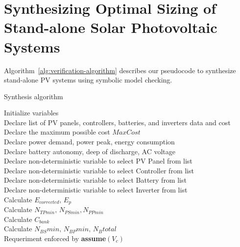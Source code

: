 \documentclass[10pt,conference]{IEEEtran}
\begin{document}
\section{Synthesizing Optimal Sizing of Stand-alone Solar Photovoltaic Systems}
Algorithm~\ref{alg:verification-algorithm} describes our pseudocode to synthesize stand-alone PV systems using symbolic model checking. 
%
 \begin{algorithm}
 \caption{Synthesis algorithm}
 \begin{algorithmic}[1]
 \begin{scriptsize}
 
 \renewcommand{\algorithmicrequire}{\textbf{Input:}}
 \renewcommand{\algorithmicensure}{\textbf{Output:}}
  \STATE Initialize variables \\
  \STATE Declare list of PV panels, controllers, batteries, and inverters data and cost \\
  \STATE Declare the maximum possible cost $MaxCost$  \\
  \STATE Declare power demand, power peak, energy consumption \\
  \STATE Declare battery autonomy, deep of discharge, AC voltage \\
 	\STATE Declare non-deterministic variable to select PV Panel from list \\
 	\STATE Declare non-deterministic variable to select Controller from list \\
 	\STATE Declare non-deterministic variable to select Battery from list \\
 	\STATE Declare non-deterministic variable to select Inverter from list \\ 	
 	\STATE Calculate $E_{corrected}, \, E_{p} $ \\
	\STATE Calculate $N_{TPmin}, \, N_{PSmin}, N_{PPmin} $ \\
 	\STATE Calculate $C_{bank}$ \\
	\STATE Calculate $N_{BS}min, \, N_{BP}min, \, N_{B}total$ \\
	\STATE Requeriment enforced by \textbf{assume}$(V_{c})$ \\

\end{scriptsize}
\end{algorithmic}
\end{algorithm}
\end{document}
